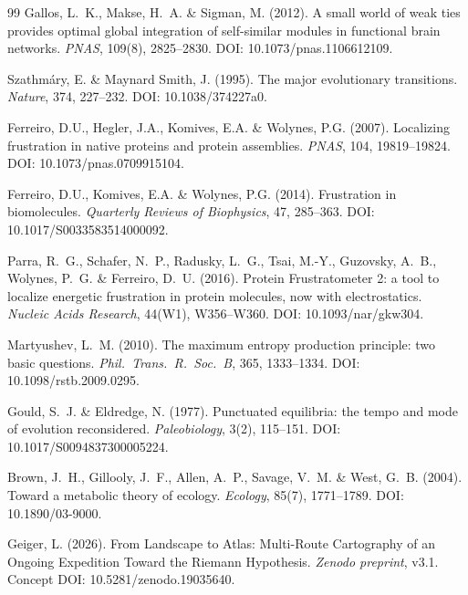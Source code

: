 \documentclass[12pt,a4paper]{article}
\theoremstyle{remark}
\begin{document}
\begin{thebibliography}{99}
Gallos, L.~K., Makse, H.~A. \& Sigman, M. (2012).
\newblock A small world of weak ties provides optimal global integration of self-similar modules in functional brain networks.
\newblock \textit{PNAS}, 109(8), 2825--2830.
\newblock DOI: 10.1073/pnas.1106612109.

Szathm\'ary, E. \& Maynard Smith, J. (1995).
\newblock The major evolutionary transitions.
\newblock \textit{Nature}, 374, 227--232.
\newblock DOI: 10.1038/374227a0.

Ferreiro, D.U., Hegler, J.A., Komives, E.A. \& Wolynes, P.G. (2007).
\newblock Localizing frustration in native proteins and protein assemblies.
\newblock \textit{PNAS}, 104, 19819--19824.
\newblock DOI: 10.1073/pnas.0709915104.

Ferreiro, D.U., Komives, E.A. \& Wolynes, P.G. (2014).
\newblock Frustration in biomolecules.
\newblock \textit{Quarterly Reviews of Biophysics}, 47, 285--363.
\newblock DOI: 10.1017/S0033583514000092.

Parra, R.~G., Schafer, N.~P., Radusky, L.~G., Tsai, M.-Y., Guzovsky, A.~B., Wolynes, P.~G. \& Ferreiro, D.~U. (2016).
\newblock Protein Frustratometer 2: a tool to localize energetic frustration in protein molecules, now with electrostatics.
\newblock \textit{Nucleic Acids Research}, 44(W1), W356--W360.
\newblock DOI: 10.1093/nar/gkw304.

Martyushev, L.~M. (2010).
\newblock The maximum entropy production principle: two basic questions.
\newblock \textit{Phil.\ Trans.\ R.\ Soc.\ B}, 365, 1333--1334.
\newblock DOI: 10.1098/rstb.2009.0295.

Gould, S.~J. \& Eldredge, N. (1977).
\newblock Punctuated equilibria: the tempo and mode of evolution reconsidered.
\newblock \textit{Paleobiology}, 3(2), 115--151.
\newblock DOI: 10.1017/S0094837300005224.

Brown, J.~H., Gillooly, J.~F., Allen, A.~P., Savage, V.~M. \& West, G.~B. (2004).
\newblock Toward a metabolic theory of ecology.
\newblock \textit{Ecology}, 85(7), 1771--1789.
\newblock DOI: 10.1890/03-9000.

Geiger, L. (2026).
\newblock From Landscape to Atlas: Multi-Route Cartography of an Ongoing Expedition Toward the Riemann Hypothesis.
\newblock \textit{Zenodo preprint}, v3.1.
\newblock Concept DOI: 10.5281/zenodo.19035640.


\end{thebibliography}
\end{document}
